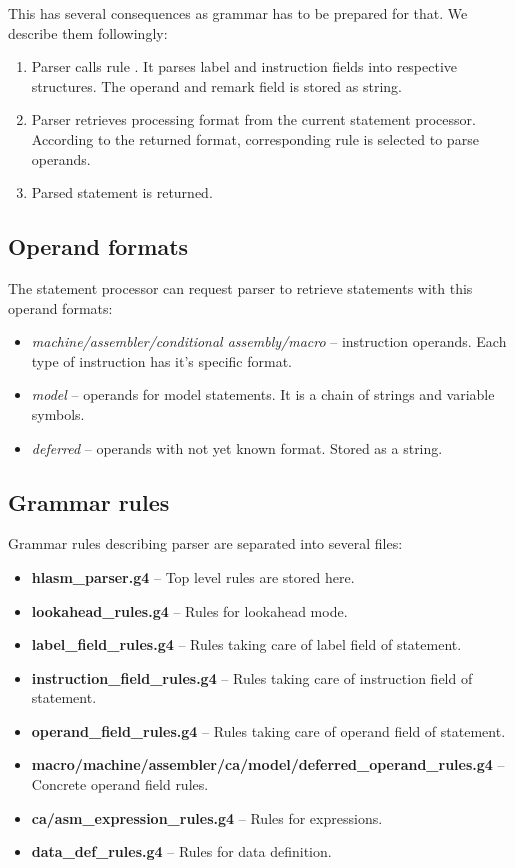 This has several consequences as grammar has to be prepared for that. We describe them followingly:

\begin{enumerate}
	\item Parser calls rule . It parses label and instruction fields into respective structures. The operand and remark field is stored as string.
	\item Parser retrieves processing format from the current statement processor. According to the returned format, corresponding rule is selected to parse operands.
	\item Parsed statement is returned.
\end{enumerate}

\subsection{Operand formats}
The statement processor can request parser to retrieve statements with this operand formats:
\begin{itemize}
	\item \emph{machine/assembler/conditional assembly/macro} -- instruction operands. Each type of instruction has it's specific format.
	\item \emph{model} -- operands for model statements. It is a chain of strings and variable symbols.
	\item \emph{deferred} -- operands with not yet known format. Stored as a string.
\end{itemize}

\subsection{Grammar rules}

Grammar rules describing parser are separated into several files:
\begin{itemize}
	\item \textbf{hlasm\_parser.g4} -- Top level rules are stored here.
	\item \textbf{lookahead\_rules.g4} -- Rules for lookahead mode.
	\item \textbf{label\_field\_rules.g4} -- Rules taking care of label field of statement.
	\item \textbf{instruction\_field\_rules.g4} -- Rules taking care of instruction field of statement.
	\item \textbf{operand\_field\_rules.g4} -- Rules taking care of operand field of statement.
	\item \textbf{macro/machine/assembler/ca/model/deferred\_operand\_rules.g4} -- Concrete operand field rules.
	\item \textbf{ca/asm\_expression\_rules.g4} -- Rules for expressions.
	\item \textbf{data\_def\_rules.g4} -- Rules for data definition.
\end{itemize}


